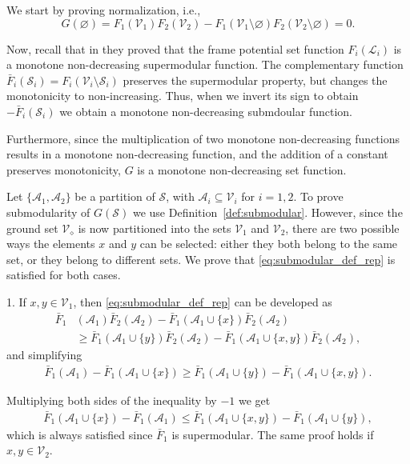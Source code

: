 \documentclass{article}
\begin{document}
We start by proving normalization, i.e.,
\begin{equation*}
	G(\varnothing)=F_1(\mathcal{V}_1)F_2(\mathcal{V}_2)-F_1(\mathcal{V}_1\setminus\varnothing)F_2(\mathcal{V}_2\setminus\varnothing)=0.
\end{equation*}

Now, recall that in \cite{frame_potential} they proved that the frame potential set function $F_i(\mathcal{L}_i)$ is a monotone non-decreasing supermodular function. The complementary function $\bar{F}_i(\mathcal{S}_i)=F_i(\mathcal{V}_i\setminus\mathcal{S}_i)$ preserves the supermodular property, but changes the monotonicity to non-increasing. Thus, when we invert its sign to obtain $-\bar{F}_i(\mathcal{S}_i)$ we obtain a monotone non-decreasing submdoular function. 

Furthermore, since the multiplication of two monotone non-decreasing functions results in a monotone non-decreasing function, and the addition of a constant preserves monotonicity, $G$ is a monotone non-decreasing set function.

Let $\{\mathcal{A}_1,\mathcal{A}_2\}$ be a partition of $\mathcal{S}$, with $\mathcal{A}_i\subseteq\mathcal{V}_i$ for $i=1,2$. To prove submodularity of $G(\mathcal{S})$ we use Definition~\ref{def:submodular}. However, since the ground set $\mathcal{V}_\diamond$ is now partitioned into the sets $\mathcal{V}_1$ and $\mathcal{V}_2$, there are two possible ways the elements $x$ and $y$ can be selected: either they both belong to the same set, or they belong to different sets. We prove that \eqref{eq:submodular_def_rep} is satisfied for both cases.

1. If $x,y\in\mathcal{V}_1$, then \eqref{eq:submodular_def_rep} can be developed as
  \begin{align*}
    \bar{F}_1&(\mathcal{A}_1)\bar{F}_2(\mathcal{A}_2)-\bar{F}_1(\mathcal{A}_1\cup\{x\})\bar{F}_2(\mathcal{A}_2)\\
    &\geq \bar{F}_1(\mathcal{A}_1\cup\{y\})\bar{F}_2(\mathcal{A}_2)- \bar{F}_1(\mathcal{A}_1\cup\{x,y\})\bar{F}_2(\mathcal{A}_2),
  \end{align*}
and simplifying
\begin{align*}
    \bar{F}_1(\mathcal{A}_1)-\bar{F}_1(\mathcal{A}_1\cup\{x\})\geq \bar{F}_1(\mathcal{A}_1\cup\{y\})- \bar{F}_1(\mathcal{A}_1\cup\{x,y\}).
\end{align*}

Multiplying both sides of the inequality by $-1$ we get
\begin{align*}
    \bar{F}_1(\mathcal{A}_1\cup\{x\})-\bar{F}_1(\mathcal{A}_1)\leq \bar{F}_1(\mathcal{A}_1\cup\{x,y\})-\bar{F}_1(\mathcal{A}_1\cup\{y\}),
\end{align*}
which is always satisfied since $\bar{F}_1$ is supermodular. The same proof holds if $x,y\in\mathcal{V}_2$.
\end{document}
